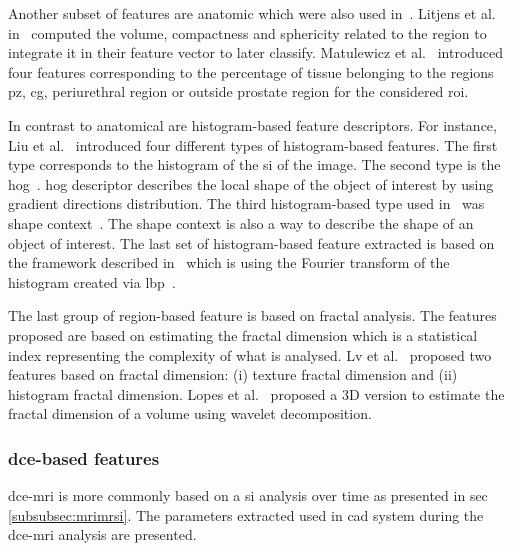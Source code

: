\begin{enumerate}[leftmargin=*]
  Another subset of features are anatomic which were also used in~\cite{Litjens2012,Litjens2014,Matulewicz2013}. Litjens et al. in~\cite{Litjens2012,Litjens2014} computed the volume, compactness and sphericity related to the region to integrate it in their feature vector to later classify. Matulewicz et al.~\cite{Matulewicz2013} introduced four features corresponding to the percentage of tissue belonging to the regions \ac{pz}, \ac{cg}, periurethral region or outside prostate region for the considered \ac{roi}.

  In contrast to anatomical are histogram-based feature descriptors. For instance, Liu et al.~\cite{Liu2013} introduced four different types of histogram-based features. The first type corresponds to the histogram of the \ac{si} of the image. The second type is the \acf{hog}~\cite{Dalal2005}. \Ac{hog} descriptor describes the local shape of the object of interest by using gradient directions distribution. The third histogram-based type used in~\cite{Liu2013} was shape context~\cite{Belongie2002}. The shape context is also a way to describe the shape of an object of interest. The last set of histogram-based feature extracted is based on the framework described in~\cite{Zhao2012} which is using the Fourier transform of the histogram created via \acf{lbp}~\cite{Ojala1996}.

  The last group of region-based feature is based on fractal analysis. The features proposed are based on estimating the fractal dimension which is a statistical index representing the complexity of what is analysed. Lv et al.~\cite{Lv2009} proposed two features based on fractal dimension: (i) texture fractal dimension and (ii) histogram fractal dimension. Lopes et al.~\cite{Lopes2011} proposed a 3D version to estimate the fractal dimension of a volume using wavelet decomposition.
\end{enumerate}

\subsubsection{\ac{dce}-based features}\label{subsubsec:fddce}

\ac{dce}-\ac{mri} is more commonly based on a \ac{si} analysis over time as presented in \ac{sec}\,\ref{subsubsec:mrimrsi}. The parameters extracted used in \ac{cad} system during the \ac{dce}-\ac{mri} analysis are presented.

